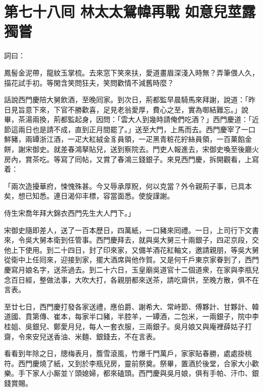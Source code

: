 
\chapter*{第七十八囘 林太太鴛幃再戰 如意兒莖露獨嘗}


詞曰：

\begin{myquote}
鳳髻金泥帶，龍紋玉掌梳。去來窓下笑來扶，愛道畫眉深淺入時無？弄筆偎人久，描花試手初。等閑含笑問狂夫，笑問歡情不減舊時麼？
\end{myquote}

話說西門慶陪大舅飲酒，至晚囘家。到次日，荊都監早晨騎馬來拜謝，說道：「昨日見旨意下來，下官不勝歡喜，足見老翁愛厚，費心之至，實為啣結難忘。」說畢，茶湯兩換，荊都監起身，因問：「雲大人到幾時請俺們吃酒？」西門慶道：「近節這兩日也是請不成，直到正月間罷了。」送至大門，上馬而去。西門慶宰了一口鮮豬，兩罈浙江酒，一疋大紅絨金豸員領，一疋黑青粧花紵絲員領，一百菓餡金餅，謝宋御史。就差春鴻拏貼兒，送到察院去。門吏人報進去，宋御史喚至後廳火房內，賞茶吃。等寫了囘帖，又賞了春鴻三錢銀子。來見西門慶，拆開觀看，上寫着：

\begin{myquote}[\markfont]
「兩次造擾華府，悚愧殊甚。今又辱承厚貺，何以克當？外令親荊子事，已具本矣，想已知悉。連日渴仰丰標，容當面悉。使旋謹謝。

侍生宋喬年拜大錦衣西門先生大人門下。」
\end{myquote}

宋御史隨即差人，送了一百本歷日，四萬紙，一口豬來囘禮。一日，上司行下文書來，令吳大舅本衛到任管事。西門慶拜去，就與吳大舅三十兩銀子，四疋京段，交他上下使用。到二十四日，封了印來家，又備羊酒花紅軸文，邀請親朋，等吳大舅從衛中上任囘來，迎接到家，擺大酒席與他作賀。又是何千戶東京家眷到了，西門慶寫月娘名字，送茶過去。到二十六日，玉皇廟吳道官十二個道衆，在家與李瓶兒念百日經，整做法事，大吹大打，各親朋都來送茶，請吃齋供，至晚方散，俱不在言表。

至廿七日，西門慶打發各家送禮，應伯爵、謝希大、常峙節、傅夥計、甘夥計、韓道國、賁第傳、崔本，每家半口豬，半腔羊，一罈酒，二包米，一兩銀子，院中李桂姐、吳銀兒、鄭愛月兒，每人一套衣服，三兩銀子。{}吳月娘又與庵裡薛姑子打齋，令來安兒送香油、米麵、銀錢去，不在言表。

看看到年除之日，牕梅表月，簷雪滾風，{}竹爆千門萬戶，家家貼春勝，處處掛桃符。西門慶燒了紙，又到於李瓶兒房，靈前祭奠。祭畢，置酒於後堂，合家大小歡樂。手下家人小厮並丫頭媳婦，都來磕頭。西門慶與吳月娘，俱有手帕、汗巾、銀錢賞賜。

